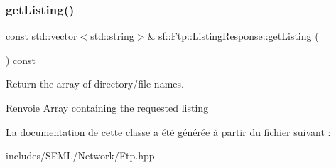 \subsubsection{\texorpdfstring{get\+Listing()}{getListing()}}
{\footnotesize\ttfamily const std\+::vector$<$std\+::string$>$\& sf\+::\+Ftp\+::\+Listing\+Response\+::get\+Listing (\begin{DoxyParamCaption}{ }\end{DoxyParamCaption}) const}



Return the array of directory/file names. 

\begin{DoxyReturn}{Renvoie}
Array containing the requested listing 
\end{DoxyReturn}


La documentation de cette classe a été générée à partir du fichier suivant \+:\begin{DoxyCompactItemize}
\item 
includes/\+S\+F\+M\+L/\+Network/Ftp.\+hpp\end{DoxyCompactItemize}
